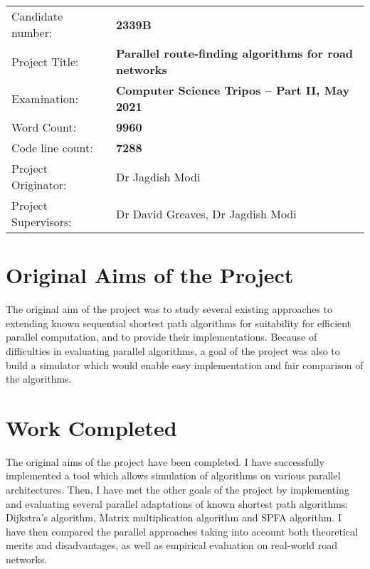 \documentclass[12pt,a4paper,oneside,openright]{report}
\begin{document}
{\large
\begin{tabular}{ll}
Candidate number:               & \bf 2339B                       \\
Project Title:      & \bf Parallel route-finding algorithms for road networks \\
Examination:        & \bf Computer Science Tripos -- Part II, May 2021  \\
Word Count:         & \bf 9960\footnotemark[1] \\
Code line count:   & \bf 7288\footnotemark[2] \\                
Project Originator: & Dr Jagdish Modi                    \\
Project Supervisors:         & Dr David Greaves, Dr Jagdish Modi                     \\ 
\end{tabular}
}

\section*{Original Aims of the Project}

The original aim of the project was to study several existing approaches to extending known sequential shortest path algorithms for suitability for efficient parallel computation, and to provide their implementations. Because of difficulties in evaluating parallel algorithms, a goal of the project was also to build a simulator which would enable easy implementation and fair comparison of the algorithms.

\section*{Work Completed}
The original aims of the project have been completed. I have successfully implemented a tool which allows simulation of algorithms on various parallel architectures. Then, I have met the other goals of the project by implementing and evaluating several parallel adaptations of known shortest path algorithms: Dijkstra's algorithm, Matrix multiplication algorithm and SPFA algorithm. I have then compared the parallel approaches taking into account both theoretical merits and disadvantages, as well as empirical evaluation on real-world road networks.
\end{document}

